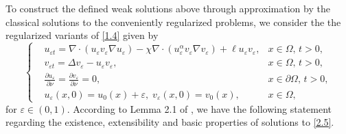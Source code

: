\documentclass[12pt]{article}
\theoremstyle{plain}
\theoremstyle{definition}
\numberwithin{equation}{section}
\begin{document}
To construct the defined weak solutions above through approximation by the classical solutions to the conveniently regularized problems, we consider the the
regularized variants of \eqref{1.4} given by
\begin{equation}\label{2.5}
\left\{
\begin{aligned}
&u_{\varepsilon t}=\nabla \cdot (u_{\varepsilon}v_{\varepsilon}\nabla u_{\varepsilon})-\chi \nabla \cdot
(u^{\alpha}_{\varepsilon}v_{\varepsilon}\nabla v_{\varepsilon})+\ell u_{\varepsilon}v_{\varepsilon},&x\in \Omega,\, t>0,\\
& v_{\varepsilon t}=\Delta v_{\varepsilon}-u_{\varepsilon}v_{\varepsilon},&x\in \Omega,\, t>0,\\
& \frac{\partial u_{\varepsilon }}{\partial \nu}=\frac{\partial v_{\varepsilon }}{\partial \nu}=0,&x\in \partial\Omega,\, t>0,\\
& u_{\varepsilon }(x,0)=u_0(x)+\varepsilon,\;v_{\varepsilon }(x,0)=v_0(x),&x\in \Omega,\,
\end{aligned}
\right.
\end{equation}
for $\varepsilon\in(0,1)$. According to Lemma 2.1 of \cite{WNARWA}, we have the following statement regarding the existence, extensibility and  basic
properties of solutions to \eqref{2.5}.
\end{document}
